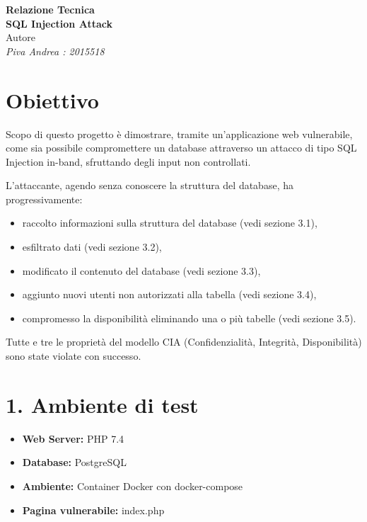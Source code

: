\documentclass[a4paper,12pt]{article}
\begin{document}
\begin{titlepage}
    \centering
    \vspace*{3cm}
    {\Large\textbf{Relazione Tecnica \\ SQL Injection Attack}}\\[2cm]
    {\large Autore}\\[0.5cm]
    {\large \textit{Piva Andrea : 2015518}}\\
    \vfill
\end{titlepage}
\setcounter{page}{1}


\section*{Obiettivo}
Scopo di questo progetto è dimostrare, tramite un'applicazione web vulnerabile, come sia possibile compromettere un database attraverso un attacco di tipo SQL Injection in-band, sfruttando degli input non controllati.

L’attaccante, agendo senza conoscere la struttura del database, ha progressivamente:

\begin{itemize}
    \item raccolto informazioni sulla struttura del database (vedi sezione 3.1),
    \item esfiltrato dati (vedi sezione 3.2),
    \item modificato il contenuto del database (vedi sezione 3.3),
    \item aggiunto nuovi utenti non autorizzati alla tabella (vedi sezione 3.4),
    \item compromesso la disponibilità eliminando una o più tabelle (vedi sezione 3.5).
\end{itemize}

Tutte e tre le proprietà del modello CIA (Confidenzialità, Integrità, Disponibilità) sono state violate con successo.

\section*{1. Ambiente di test}
\begin{itemize}
    \item \textbf{Web Server:} PHP 7.4
    \item \textbf{Database:} PostgreSQL
    \item \textbf{Ambiente:} Container Docker con docker-compose
    \item \textbf{Pagina vulnerabile:} index.php
\end{itemize}
\end{document}
